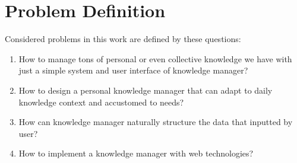 \section{Problem Definition}
\label{sec:problem-definition}

Considered problems in this work are defined by these questions:

\begin{enumerate}
\item How to manage tons of personal or even collective knowledge we have with just a simple system and user interface of knowledge manager?
\item How to design a personal knowledge manager that can adapt to daily knowledge context and accustomed to needs?
\item How can knowledge manager naturally structure the data that inputted by user?
\item How to implement a knowledge manager with web technologies?
\end{enumerate}


